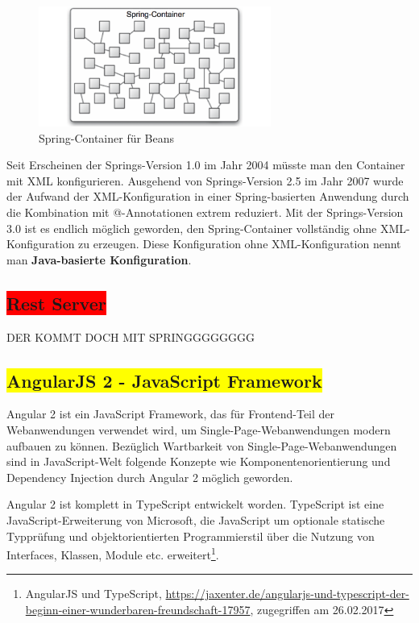 \begin{figure}[H]
\centering
\includegraphics[width=3.0in]{resources/container}
\caption[Spring-Container für Beans]{Spring-Container für Beans}
\label{img:container}
\end{figure}
Seit Erscheinen der Springs-Version 1.0 im Jahr 2004 müsste man den Container mit XML konfigurieren. Ausgehend von Springs-Version 2.5 im Jahr 2007 wurde der Aufwand der XML-Konfiguration in einer Spring-basierten Anwendung durch die Kombination mit @-Annotationen extrem reduziert. Mit der Springs-Version 3.0 ist es endlich möglich geworden, den Spring-Container vollständig ohne XML-Konfiguration zu erzeugen. Diese Konfiguration ohne XML-Konfiguration nennt man \textbf{Java-basierte Konfiguration}.

\subsection{\colorbox{red}{Rest Server}}
DER KOMMT DOCH MIT SPRINGGGGGGGG

\subsection{\colorbox{yellow}{AngularJS 2 - JavaScript Framework}}

Angular 2 ist ein JavaScript Framework, das für Frontend-Teil der Webanwendungen verwendet wird, um Single-Page-Webanwendungen modern aufbauen zu können. Bezüglich Wartbarkeit von Single-Page-Webanwendungen sind in JavaScript-Welt folgende Konzepte wie Komponentenorientierung und Dependency Injection durch Angular 2 möglich geworden.

Angular 2 ist komplett in TypeScript entwickelt worden. TypeScript ist eine JavaScript-Erweiterung von Microsoft, die JavaScript um optionale statische Typprüfung und objektorientierten Programmierstil über die Nutzung von Interfaces, Klassen, Module etc. erweitert\footnote{AngularJS und TypeScript, \url{https://jaxenter.de/angularjs-und-typescript-der-beginn-einer-wunderbaren-freundschaft-17957}, zugegriffen am 26.02.2017}.

